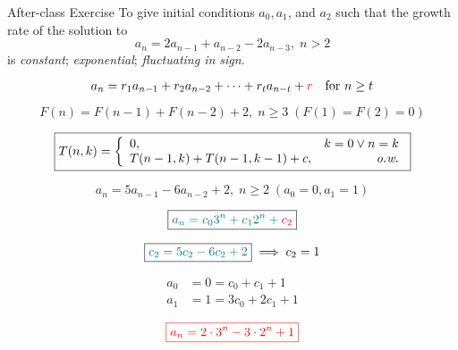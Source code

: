 \begin{frame}{}
  \begin{exampleblock}{After-class Exercise}
    To give initial conditions $a_0, a_1$, and $a_2$ such that the growth rate of the solution to
    \[
      a_n = 2a_{n-1} + a_{n-2} - 2a_{n-3},\; n > 2
    \]
    is  {\it constant};  {\it exponential};  {\it fluctuating in sign}.
  \end{exampleblock}

  \pause
  \vspace{0.50cm}
\end{frame}

\begin{frame}{}
  \centerline{}

  \[
    a_n = r_1 a_{n-1} + r_2 a_{n-2} + \cdots + r_t a_{n-t} + \textcolor{red}{r} \quad \text{for } n \ge t
  \]

  \pause
  \[
    F(n) = F(n-1) + F(n-2) + 2, \; n \ge 3\; (F(1) = F(2) = 0)
  \]

  \pause
  \vspace{-0.30cm}
  \[
    \boxed{T(n,k) = \left\{\begin{array}{lr}
      0, & k = 0 \lor n = k \\
      T(n-1, k) + T(n-1, k-1) + c, & \text{\it o.w.}
    \end{array}\right.}
  \]
\end{frame}

\begin{frame}{}
  \[
    a_n = 5a_{n-1} - 6a_{n-2} + 2, \; n \ge 2 \; (a_0 = 0, a_1 = 1)
  \]

  \pause
  \[
    \boxed{\textcolor{teal}{a_n = c_0 3^n + c_1 2^n + \textcolor{red}{c_2}}}
  \]

  \pause
  \[
    \boxed{\textcolor{teal}{c_2 = 5c_2 - 6c_2 + 2}} \implies c_2 = 1
  \]

  \pause
  \begin{align*}
    a_0 &= 0 = c_0 + c_1 + 1\\
    a_1 &= 1 = 3c_0 + 2c_1 + 1
  \end{align*}

  \pause
  \[
    \textcolor{red}{\boxed{a_n = 2 \cdot 3^n - 3 \cdot 2^n + 1}}
  \]
\end{frame}


